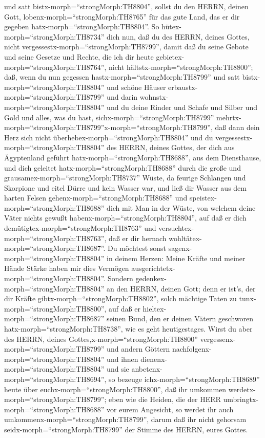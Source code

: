 und satt bistx-morph=``strongMorph:TH8804'', sollst du den HERRN, deinen
Gott, lobenx-morph=``strongMorph:TH8765'' für das gute Land, das er dir
gegeben hatx-morph=``strongMorph:TH8804''.  So
hütex-morph=``strongMorph:TH8734'' dich nun, daß du des HERRN, deines
Gottes, nicht vergessestx-morph=``strongMorph:TH8799'', damit daß du
seine Gebote und seine Gesetze und Rechte, die ich dir heute
gebietex-morph=``strongMorph:TH8764'', nicht
hältstx-morph=``strongMorph:TH8800'';  daß, wenn du nun
gegessen hastx-morph=``strongMorph:TH8799'' und satt
bistx-morph=``strongMorph:TH8804'' und schöne Häuser
erbaustx-morph=``strongMorph:TH8799'' und darin
wohnstx-morph=``strongMorph:TH8804''  und du deine Rinder
und Schafe und Silber und Gold und alles, was du hast,
sichx-morph=``strongMorph:TH8799''
mehrtx-morph=``strongMorph:TH8799''x-morph=``strongMorph:TH8799'',
 daß dann dein Herz sich nicht
überhebex-morph=``strongMorph:TH8804'' und du
vergessestx-morph=``strongMorph:TH8804'' des HERRN, deines Gottes, der
dich aus Ägyptenland geführt hatx-morph=``strongMorph:TH8688'', aus dem
Diensthause,  und dich geleitet
hatx-morph=``strongMorph:TH8688'' durch die große und
grausamex-morph=``strongMorph:TH8737'' Wüste, da feurige Schlangen und
Skorpione und eitel Dürre und kein Wasser war, und ließ dir Wasser aus
dem harten Felsen gehenx-morph=``strongMorph:TH8688''  und
speistex-morph=``strongMorph:TH8688'' dich mit Man in der Wüste, von
welchem deine Väter nichts gewußt habenx-morph=``strongMorph:TH8804'',
auf daß er dich demütigtex-morph=``strongMorph:TH8763'' und
versuchtex-morph=``strongMorph:TH8763'', daß er dir hernach
wohltätex-morph=``strongMorph:TH8687''.  Du möchtest sonst
sagenx-morph=``strongMorph:TH8804'' in deinem Herzen: Meine Kräfte und
meiner Hände Stärke haben mir dies Vermögen
ausgerichtetx-morph=``strongMorph:TH8804''.  Sondern
gedenkex-morph=``strongMorph:TH8804'' an den HERRN, deinen Gott; denn er
ist's, der dir Kräfte gibtx-morph=``strongMorph:TH8802'', solch mächtige
Taten zu tunx-morph=``strongMorph:TH8800'', auf daß er
hieltex-morph=``strongMorph:TH8687'' seinen Bund, den er deinen Vätern
geschworen hatx-morph=``strongMorph:TH8738'', wie es geht heutigestages.
 Wirst du aber des HERRN, deines
Gottes,x-morph=``strongMorph:TH8800''
vergessenx-morph=``strongMorph:TH8799'' und andern Göttern
nachfolgenx-morph=``strongMorph:TH8804'' und ihnen
dienenx-morph=``strongMorph:TH8804'' und sie
anbetenx-morph=``strongMorph:TH8694'', so bezeuge
ichx-morph=``strongMorph:TH8689'' heute über
euchx-morph=``strongMorph:TH8800'', daß ihr umkommen
werdetx-morph=``strongMorph:TH8799'';  eben wie die Heiden,
die der HERR umbringtx-morph=``strongMorph:TH8688'' vor eurem Angesicht,
so werdet ihr auch umkommenx-morph=``strongMorph:TH8799'', darum daß ihr
nicht gehorsam seidx-morph=``strongMorph:TH8799'' der Stimme des HERRN,
eures Gottes.


